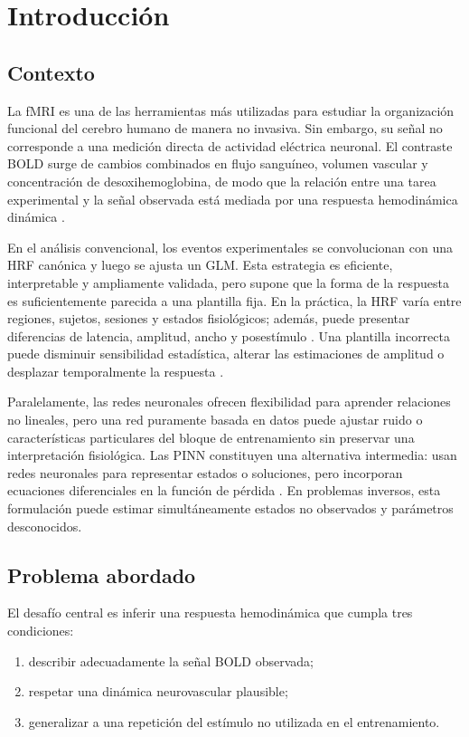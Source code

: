 \chapter{Introducción}

\section{Contexto}
La fMRI es una de las herramientas más utilizadas para estudiar la organización funcional del cerebro humano de manera no invasiva. Sin embargo, su señal no corresponde a una medición directa de actividad eléctrica neuronal. El contraste BOLD surge de cambios combinados en flujo sanguíneo, volumen vascular y concentración de desoxihemoglobina, de modo que la relación entre una tarea experimental y la señal observada está mediada por una respuesta hemodinámica dinámica \citep{Buxton1998,Friston2000}.

En el análisis convencional, los eventos experimentales se convolucionan con una HRF canónica y luego se ajusta un GLM. Esta estrategia es eficiente, interpretable y ampliamente validada, pero supone que la forma de la respuesta es suficientemente parecida a una plantilla fija. En la práctica, la HRF varía entre regiones, sujetos, sesiones y estados fisiológicos; además, puede presentar diferencias de latencia, amplitud, ancho y posestímulo \citep{Handwerker2004,Neumann2003,Rangaprakash2018}. Una plantilla incorrecta puede disminuir sensibilidad estadística, alterar las estimaciones de amplitud o desplazar temporalmente la respuesta \citep{Lindquist2009,LindquistWager2007}.

Paralelamente, las redes neuronales ofrecen flexibilidad para aprender relaciones no lineales, pero una red puramente basada en datos puede ajustar ruido o características particulares del bloque de entrenamiento sin preservar una interpretación fisiológica. Las PINN constituyen una alternativa intermedia: usan redes neuronales para representar estados o soluciones, pero incorporan ecuaciones diferenciales en la función de pérdida \citep{Raissi2019}. En problemas inversos, esta formulación puede estimar simultáneamente estados no observados y parámetros desconocidos.

\section{Problema abordado}
El desafío central es inferir una respuesta hemodinámica que cumpla tres condiciones:
\begin{enumerate}
  \item describir adecuadamente la señal BOLD observada;
  \item respetar una dinámica neurovascular plausible;
  \item generalizar a una repetición del estímulo no utilizada en el entrenamiento.
\end{enumerate}

